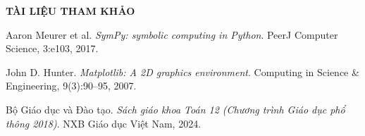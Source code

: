 \begin{center}
{{\bf\fontsize{14pt}{14.5pt}\selectfont 
TÀI LIỆU THAM KHẢO}}
\end{center}

\begin{enumerate}[label={[\arabic*]}]
    \item Aaron Meurer et al. \textit{SymPy: symbolic computing in Python}. PeerJ Computer Science, 3:e103, 2017.
    \item John D. Hunter. \textit{Matplotlib: A 2D graphics environment}. Computing in Science \& Engineering, 9(3):90--95, 2007.
    \item Bộ Giáo dục và Đào tạo. \textit{Sách giáo khoa Toán 12 (Chương trình Giáo dục phổ thông 2018)}. NXB Giáo dục Việt Nam, 2024.
\end{enumerate}